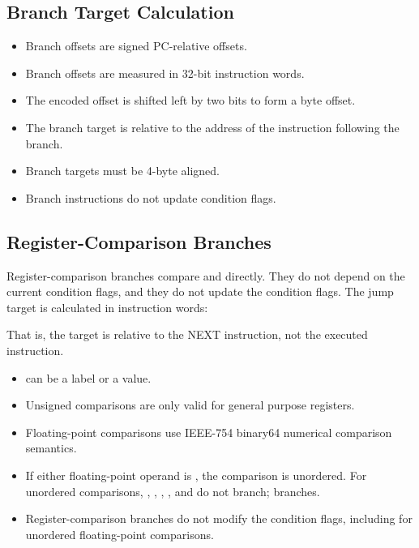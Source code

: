 \subsection{Branch Target Calculation}

\begin{itemize}
  \item Branch offsets are signed PC-relative offsets.
  \item Branch offsets are measured in 32-bit instruction words.
  \item The encoded offset is shifted left by two bits to form a byte offset.
  \item The branch target is relative to the address of the instruction
        following the branch.
  \item Branch targets must be 4-byte aligned.
  \item Branch instructions do not update condition flags.
\end{itemize}

\subsection{Register-Comparison Branches}

Register-comparison branches compare  and  directly. They do
not depend on the current condition flags, and they do not update the condition
flags. The jump target is calculated in instruction words:


\noindent
That is, the target is relative to the NEXT instruction, not the executed
instruction.
\begin{itemize}
\item {} can be a label or a value.
\item Unsigned comparisons are only valid for general purpose registers.
\item Floating-point comparisons use IEEE-754 binary64 numerical comparison semantics.
\item If either floating-point operand is , the comparison is unordered.
For unordered comparisons, , , ,
, and  do not branch;  branches.
\item Register-comparison branches do not modify the condition flags, including for
unordered floating-point comparisons.
\end{itemize}

